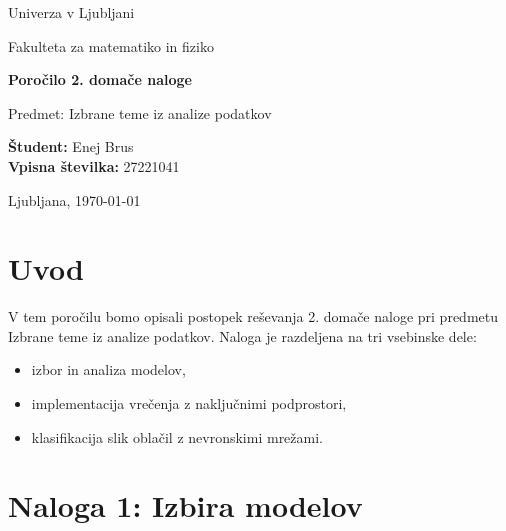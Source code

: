 \documentclass[12pt,a4paper]{article}
\begin{document}
\begin{titlepage}
    \centering

    {\Large Univerza v Ljubljani\par}
    \vspace{0.5cm}
    {\large Fakulteta za matematiko in fiziko\par}

    \vfill

    {\Huge \bfseries Poročilo 2. domače naloge\par}
    \vspace{1cm}
    {\Large Predmet: Izbrane teme iz analize podatkov\par}

    \vfill

    \begin{flushleft}
        \large
        \textbf{Študent:} Enej Brus\\
        \textbf{Vpisna številka:} 27221041\\
     \end{flushleft}

    \vfill

    {\large Ljubljana, \today\par}
\end{titlepage}

\tableofcontents
\newpage

\section*{Uvod}
V tem poročilu bomo opisali postopek reševanja 2. domače naloge pri predmetu Izbrane teme iz analize podatkov.
Naloga je razdeljena na tri vsebinske dele:
\begin{itemize}
    \item izbor in analiza modelov,
    \item implementacija vrečenja z naključnimi podprostori,
    \item klasifikacija slik oblačil z nevronskimi mrežami.
\end{itemize}


\section*{Naloga 1: Izbira modelov}
\end{document}
